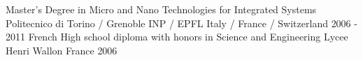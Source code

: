 



\begin{cventries}

  \cventry
    {Master's Degree in Micro and Nano Technologies for Integrated Systems} %
    {Politecnico di Torino / Grenoble INP / EPFL} %
    {Italy / France / Switzerland} %
    {2006 - 2011} %
    {}
  \cventry
    {French High school diploma with honors in Science and Engineering} %
    {Lycee Henri Wallon} %
    {France} %
    {2006} %
    {}

\end{cventries}
